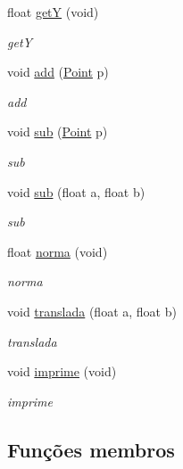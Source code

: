 \begin{DoxyCompactItemize}
float \mbox{\hyperlink{class_point_a2444daa96871c89614510bc4bfcd19ce}{getY}} (void)
\begin{DoxyCompactList}\small\item\em getY \end{DoxyCompactList}\item 
void \mbox{\hyperlink{class_point_ac9a66031ad1569df5990940b3d423a06}{add}} (\mbox{\hyperlink{class_point}{Point}} p)
\begin{DoxyCompactList}\small\item\em add \end{DoxyCompactList}\item 
void \mbox{\hyperlink{class_point_a0871d9a460a8d19f27907e74c81c8c28}{sub}} (\mbox{\hyperlink{class_point}{Point}} p)
\begin{DoxyCompactList}\small\item\em sub \end{DoxyCompactList}\item 
void \mbox{\hyperlink{class_point_a99934f79c7e40a4cf6f3ea4bf9b12631}{sub}} (float a, float b)
\begin{DoxyCompactList}\small\item\em sub \end{DoxyCompactList}\item 
float \mbox{\hyperlink{class_point_aa3005a9d97e2cb05624414973a214788}{norma}} (void)
\begin{DoxyCompactList}\small\item\em norma \end{DoxyCompactList}\item 
void \mbox{\hyperlink{class_point_ad9676e36f3444534b609e3c68422239a}{translada}} (float a, float b)
\begin{DoxyCompactList}\small\item\em translada \end{DoxyCompactList}\item 
\mbox{\label{class_point_a188350fb70e5b297a659a31ab8887ca3}} 
void \mbox{\hyperlink{class_point_a188350fb70e5b297a659a31ab8887ca3}{imprime}} (void)
\begin{DoxyCompactList}\small\item\em imprime \end{DoxyCompactList}\end{DoxyCompactItemize}


\subsection{Funções membros}
\mbox{\label{class_point_ac9a66031ad1569df5990940b3d423a06}} 
